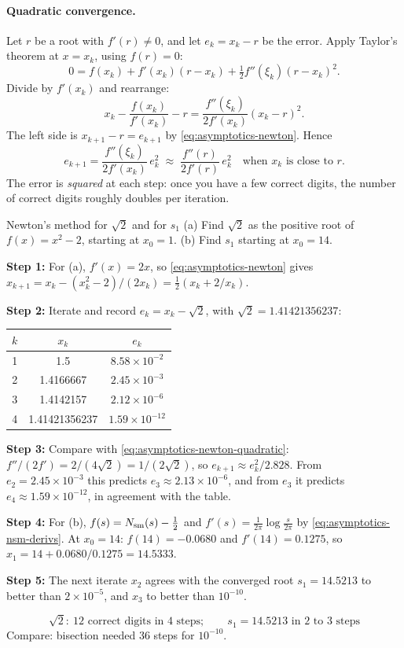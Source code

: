\paragraph{Quadratic convergence.} Let $r$ be a root with $f'(r)\ne0$, and let $e_k=x_k-r$ be the error. Apply Taylor's theorem at $x=x_k$, using $f(r)=0$:
\[
0=f(x_k)+f'(x_k)(r-x_k)+\tfrac12f''(\xi_k)(r-x_k)^2 .
\]
Divide by $f'(x_k)$ and rearrange:
\[
x_k-\frac{f(x_k)}{f'(x_k)}-r=\frac{f''(\xi_k)}{2f'(x_k)}(x_k-r)^2 .
\]
The left side is $x_{k+1}-r=e_{k+1}$ by \cref{eq:asymptotics-newton}. Hence
\begin{equation}
e_{k+1}=\frac{f''(\xi_k)}{2f'(x_k)}\,e_k^2\;\approx\;\frac{f''(r)}{2f'(r)}\,e_k^2\quad\text{when }x_k\text{ is close to }r.
\label{eq:asymptotics-newton-quadratic}
\end{equation}
The error is \emph{squared} at each step: once you have a few correct digits, the number of correct digits roughly doubles per iteration.

\begin{sample}{Newton's method for $\sqrt2$ and for $s_1$}
(a) Find $\sqrt2$ as the positive root of $f(x)=x^2-2$, starting at $x_0=1$. (b) Find $s_1$ starting at $x_0=14$.

\textbf{Step 1:} For (a), $f'(x)=2x$, so \cref{eq:asymptotics-newton} gives $x_{k+1}=x_k-(x_k^2-2)/(2x_k)=\tfrac12(x_k+2/x_k)$.

\textbf{Step 2:} Iterate and record $e_k=x_k-\sqrt2$, with $\sqrt2=1.41421356237$:
\begin{center}
\begin{tabular}{ccc}
\toprule
$k$ & $x_k$ & $e_k$\\
\midrule
1 & 1.5 & $8.58\times10^{-2}$\\
2 & 1.4166667 & $2.45\times10^{-3}$\\
3 & 1.4142157 & $2.12\times10^{-6}$\\
4 & 1.41421356237 & $1.59\times10^{-12}$\\
\bottomrule
\end{tabular}
\end{center}

\textbf{Step 3:} Compare with \cref{eq:asymptotics-newton-quadratic}: $f''/(2f')=2/(4\sqrt2)=1/(2\sqrt2)$, so $e_{k+1}\approx e_k^2/2.828$. From $e_2=2.45\times10^{-3}$ this predicts $e_3\approx2.13\times10^{-6}$, and from $e_3$ it predicts $e_4\approx1.59\times10^{-12}$, in agreement with the table.

\textbf{Step 4:} For (b), $f(s)=N_{\mathrm{sm}}(s)-\tfrac12$ and $f'(s)=\frac{1}{2\pi}\log\frac{s}{2\pi}$ by \cref{eq:asymptotics-nsm-derivs}. At $x_0=14$: $f(14)=-0.0680$ and $f'(14)=0.1275$, so $x_1=14+0.0680/0.1275=14.5333$.

\textbf{Step 5:} The next iterate $x_2$ agrees with the converged root $s_1=14.5213$ to better than $2\times10^{-5}$, and $x_3$ to better than $10^{-10}$.

\[
\boxed{\sqrt2:\ 12\text{ correct digits in 4 steps};\qquad s_1=14.5213\text{ in 2 to 3 steps}}
\]
Compare: bisection needed 36 steps for $10^{-10}$.
\end{sample}

